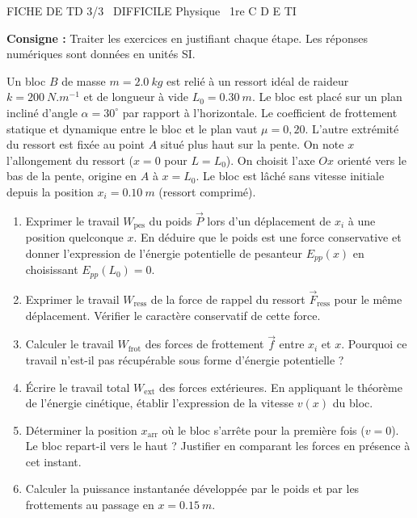 \documentclass[11pt]{article}
\begin{document}
\begin{tcolorbox}[enhanced,colback=popink,colframe=popink,arc=10pt,boxrule=0pt,left=12pt,right=12pt,top=9pt,bottom=9pt]
{\color{white}\popxbold\small FICHE DE TD 3/3 \textbullet\ DIFFICILE \hfill Physique \textbullet\ 1re C D E TI\par}
\end{tcolorbox}
\vspace{4pt}
\noindent \textbf{Consigne :} Traiter les exercices en justifiant chaque étape. Les réponses numériques sont données en unités SI.

\begin{exercice}
Un bloc $B$ de masse $m = \SI{2,0}{kg}$ est relié à un ressort idéal de raideur $k = \SI{200}{N.m^{-1}}$ et de longueur à vide $L_0 = \SI{0,30}{m}$. Le bloc est placé sur un plan incliné d'angle $\alpha = 30^{\circ}$ par rapport à l'horizontale. Le coefficient de frottement statique et dynamique entre le bloc et le plan vaut $\mu = 0,20$. L'autre extrémité du ressort est fixée au point $A$ situé plus haut sur la pente. On note $x$ l'allongement du ressort ($x=0$ pour $L=L_0$). On choisit l'axe $Ox$ orienté vers le bas de la pente, origine en $A$ à $x = L_0$. Le bloc est lâché sans vitesse initiale depuis la position $x_i = \SI{0,10}{m}$ (ressort comprimé).
\begin{enumerate}
    \item Exprimer le travail $W_{\text{pes}}$ du poids $\vec{P}$ lors d'un déplacement de $x_i$ à une position quelconque $x$. En déduire que le poids est une force conservative et donner l'expression de l'énergie potentielle de pesanteur $E_{pp}(x)$ en choisissant $E_{pp}(L_0)=0$.
    \item Exprimer le travail $W_{\text{ress}}$ de la force de rappel du ressort $\vec{F}_{\text{ress}}$ pour le même déplacement. Vérifier le caractère conservatif de cette force.
    \item Calculer le travail $W_{\text{frot}}$ des forces de frottement $\vec{f}$ entre $x_i$ et $x$. Pourquoi ce travail n'est-il pas récupérable sous forme d'énergie potentielle ?
    \item Écrire le travail total $W_{\text{ext}}$ des forces extérieures. En appliquant le théorème de l'énergie cinétique, établir l'expression de la vitesse $v(x)$ du bloc.
    \item Déterminer la position $x_{\text{arr}}$ où le bloc s'arrête pour la première fois ($v=0$). Le bloc repart-il vers le haut ? Justifier en comparant les forces en présence à cet instant.
    \item Calculer la puissance instantanée développée par le poids et par les frottements au passage en $x = \SI{0,15}{m}$.
\end{enumerate}
\end{exercice}
\end{document}
